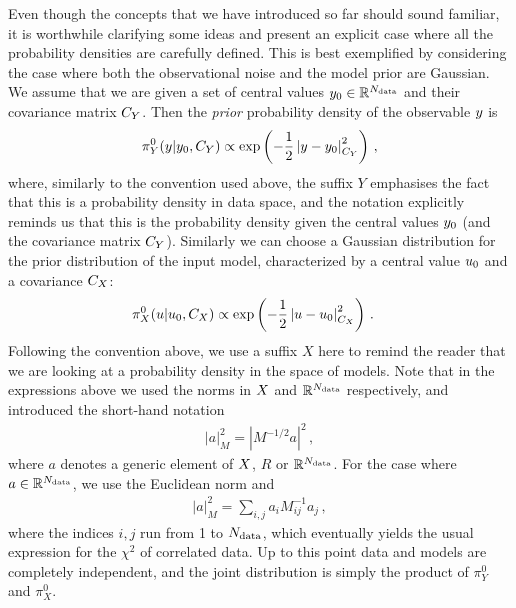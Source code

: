 Even though the concepts that we have introduced so far should sound familiar,
it is worthwhile clarifying some ideas and present an explicit case where all
the probability densities are carefully defined. This is best exemplified by
considering the case where both the observational noise and the model prior are
Gaussian. We assume that we are given a set of central values $y_0 \in
\mathbb{R}^{N_{\rm data}}$ and their covariance matrix $C_{Y}$. Then the {\em prior}
probability density of the observable $y$ is 
\begin{equation}
  \label{eq:PriorData}
  \pi_{Y}^0(y|y_0,C_{Y}) \propto \exp\left(
    -\frac12 \left| y - y_0 \right|_{C_{Y}}^2
    \right)\, ,
\end{equation}
where, similarly to the convention used above, the suffix $Y$ emphasises the
fact that this is a probability density in data space, and the notation
explicitly reminds us that this is the probability density given the central
values $y_0$ (and the covariance matrix $C_{Y}$). Similarly we
can choose a Gaussian distribution for the prior distribution of the input
model, characterized by a central value $u_0$ and a covariance
$C_X$:
\begin{align}
  \label{eq:PiZeroGauss}
  \pi_{X}^0(u|u_0,C_X)  
  &\propto \exp\left(
              -\frac12 \left| u - u_0 \right|_{C_X}^2
              \right)\, .
\end{align}
Following the convention above, we use a suffix $X$ here to remind the reader
that we are looking at a probability density in the space of models. Note that
in the expressions above we used the norms in $X$ and $\mathbb{R}^{N_{\rm data}}$
respectively, and introduced the short-hand notation
\begin{align}
  \left|a\right|_M^2 = \left| M^{-1/2} a\right|^2\, ,
\end{align}
where $a$ denotes a generic element of $X$, $R$ or $\mathbb{R}^{N_{\rm data}}$.
For the case where $a \in \mathbb{R}^{N_{\rm data}}$, we use the Euclidean norm and
\begin{align}
  \left| a \right|_M^2 = \sum_{i,j} a_i M^{-1}_{ij} a_j\, ,
\end{align}
where the indices $i,j$ run from 1 to $N_{\rm data}$, which eventually yields the
usual expression for the $\chi^2$ of correlated data.   
Up to this point data and models are completely independent, and the joint
distribution is simply the product of $\pi_{Y}^0$ and $\pi_{X}^0$. 

